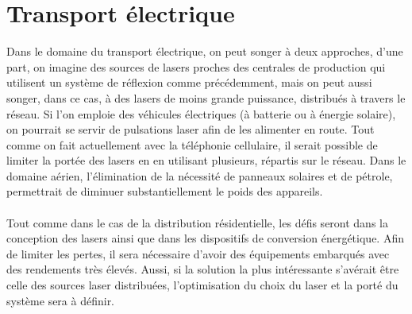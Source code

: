 \section{Transport électrique}
Dans le domaine du transport électrique, on peut songer à deux approches, d'une part, on imagine des sources de lasers proches des centrales de production qui utilisent un système de réflexion comme précédemment, mais on peut aussi songer, dans ce cas, à des lasers de moins grande puissance, distribués à travers le réseau. Si l'on emploie des véhicules électriques (à batterie ou à énergie solaire), on pourrait se servir de pulsations laser afin de les alimenter en route. Tout comme on fait actuellement avec la téléphonie cellulaire, il serait possible de limiter la portée des lasers en en utilisant plusieurs, répartis sur le réseau. Dans le domaine aérien, l'élimination de la nécessité de panneaux solaires et de pétrole, permettrait de diminuer substantiellement le poids des appareils. 

\paragraph{} Tout comme dans le cas de la distribution résidentielle, les défis seront dans la conception des lasers ainsi que dans les dispositifs de conversion énergétique. Afin de limiter les pertes, il sera nécessaire d'avoir des équipements embarqués avec des rendements très élevés. Aussi, si la solution la plus intéressante s'avérait être celle des sources laser distribuées, l'optimisation du choix du laser et la porté du système sera à définir. 